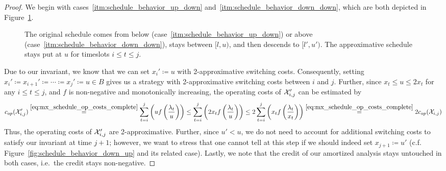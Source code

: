 \begin{proof}
We begin with cases~\ref{itm:schedule_behavior_up_down} and~\ref{itm:schedule_behavior_down_down}, which are both depicted in Figure~\ref{fig:schedule_behavior_down}.
\begin{figure}[ht]
\captionsetup[subfigure]{labelformat=empty}
\begin{subfigure}[b]{0.49\textwidth}

\end{subfigure}
\hfill
\begin{subfigure}[b]{0.49\textwidth}

\end{subfigure}
\caption{The original schedule comes from below (case~\ref{itm:schedule_behavior_up_down}) or above (case~\ref{itm:schedule_behavior_down_down}), stays between $[l,u)$, and then descends to $[l',u')$. The approximative schedule stays put at $u$ for timeslots $i\le t\le j$.}
\label{fig:schedule_behavior_down}
\end{figure}
Due to our invariant, we know that we can set $x_i'\coloneqq u$ with 2-approximative switching costs. Consequently, setting $x_i'\coloneqq x_{i+1}'\coloneqq\dotsb\coloneqq x_j'\coloneqq u\in B$ gives us a strategy with 2-approximative switching costs between $i$ and $j$. Further, since $x_t\le u\le2x_t$ for any $i\le t\le j$, and $f$ is non-negative and monotonically increasing, the operating costs of $\mathcal{X}'_{i,j}$ can be estimated by
\begin{equation*}
	c_{op}(\mathcal{X}_{i,j}')\stackrel{\eqref{eq:mx_schedule_op_costs_complete}}{=}\sum\limits_{t=i}^j\left(uf\left(\frac{\lambda_t}{u}\right)\right)\le\sum\limits_{t=i}^j\left(2x_tf\left(\frac{\lambda_t}{u}\right)\right)\le2\sum\limits_{t=i}^j\left(x_tf\left(\frac{\lambda_t}{x_t}\right)\right)\stackrel{\eqref{eq:mx_schedule_op_costs_complete}}{=}2c_{op}(\mathcal{X}_{i,j})
\end{equation*}
Thus, the operating costs of $\mathcal{X}_{i,j}'$ are 2-approximative. Further, since $u'<u$, we do not need to account for additional switching costs to satisfy our invariant at time $j+1$; however, we want to stress that one cannot tell at this step if we should indeed set $x_{j+1}\coloneqq u'$ (c.f. Figure~\ref{fig:schedule_behavior_down_up} and its related case). Lastly, we note that the credit of our amortized analysis stays untouched in both cases, i.e.\ the credit stays non-negative.
	

\end{proof}
